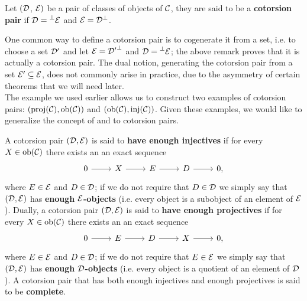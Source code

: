 \begin{definition}
	Let $(\mathcal{D}$, $\mathcal{E})$ be a pair of classes of objects of $\mathcal{C}$, they are said to be a \textbf{cotorsion pair} if $\mathcal{D} = \prescript{\perp}{}{\mathcal{E}}$ and $\mathcal{E} = {\mathcal{D}}^\perp$.
\end{definition}


One common way to define a cotorsion pair is to cogenerate it from a set, i.e. to choose a set $\mathcal{D}'$ and let $\mathcal{E} = {\mathcal{D}'}^\perp$ and $\mathcal{D} = \prescript{\perp}{}{\mathcal{E}}$; the above remark proves that it is actually a cotorsion pair. The dual notion, generating the cotorsion pair from a set $\mathcal{E}' \subseteq \mathcal{E}$, does not commonly arise in practice, due to the asymmetry of certain theorems that we will need later. \\


The example we used earlier allows us to construct two examples of cotorsion pairs: $(\mathrm{proj}(\mathcal{C}), \mathrm{ob}(\mathcal{C}))$ and $(\mathrm{ob}(\mathcal{C}),\mathrm{inj}(\mathcal{C}))$. Given these examples, we would like to generalize the concept of  and  to cotorsion pairs.



\begin{definition}
	A cotorsion pair $(\mathcal{D}, \mathcal{E})$ is said to \textbf{have enough injectives} if for every $X \in \mathrm{ob}(\mathcal{C})$ there exists an an exact sequence
	\[\begin{tikzcd}
		0 & X & E & D & {0,}
		\arrow[from=1-1, to=1-2]
		\arrow[from=1-2, to=1-3]
		\arrow[from=1-3, to=1-4]
		\arrow[from=1-4, to=1-5]
	\end{tikzcd}\]
	where $E\in \mathcal{E}$ and $D \in \mathcal{D}$; if we do not require that $D \in \mathcal{D}$ we simply say that $(\mathcal{D}, \mathcal{E})$ has \textbf{enough} $\mathcal{E}$\textbf{-objects} (i.e. every object is a subobject of an element of $\mathcal{E}$). Dually, a cotorsion pair $(\mathcal{D}, \mathcal{E})$ is said to \textbf{have enough projectives} if for every $X \in \mathrm{ob}(\mathcal{C})$ there exists an an exact sequence
	\[\begin{tikzcd}
		0 & E & D & X & {0,}
		\arrow[from=1-1, to=1-2]
		\arrow[from=1-2, to=1-3]
		\arrow[from=1-3, to=1-4]
		\arrow[from=1-4, to=1-5]
	\end{tikzcd}\]
	where $E\in \mathcal{E}$ and $D \in \mathcal{D}$; if we do not require that $E \in \mathcal{E}$ we simply say that $(\mathcal{D}, \mathcal{E})$ has \textbf{enough} $\mathcal{D}$\textbf{-objects} (i.e. every object is a quotient of an element of $\mathcal{D}$). A cotorsion pair that has both enough injectives and enough projectives is said to be \textbf{complete}.
\end{definition}





